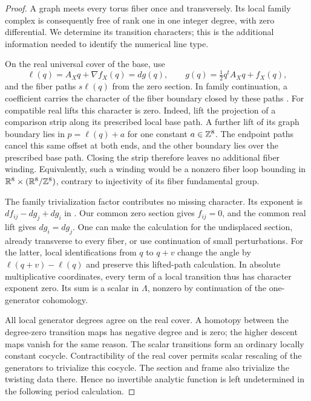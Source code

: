 \begin{proof}
A graph meets every torus fiber once and transversely.  Its local
family complex is consequently free of rank one in one integer
degree, with zero differential.  We determine its transition
characters; this is the additional information needed to identify
the numerical line type.

On the real universal cover of the base, use
\[
 \ell(q)=A_Xq+\nabla f_X(q)=dg(q),\qquad
 g(q)=\tfrac12q^tA_Xq+f_X(q),
\]
and the fiber paths $s\ell(q)$ from the zero section.  In family
continuation, a coefficient carries the character of the fiber
boundary closed by these paths
\cite[\S\S2.2 and 8.2]{abouzaid-faithful}.  For compatible real lifts
this character is zero.  Indeed, lift the projection of a comparison
strip along its prescribed local base path.  A further lift of its
graph boundary lies in
$p=\ell(q)+a$ for one constant $a\in\mathbb Z^8$.  The endpoint paths cancel
this same offset at both ends, and the other boundary lies over the
prescribed base path.  Closing the strip therefore leaves no
additional fiber winding.  Equivalently, such a winding would be a
nonzero fiber loop bounding in
$\mathbb R^8\times(\mathbb R^8/\mathbb Z^8)$, contrary to injectivity of its fiber
fundamental group.

The family trivialization factor contributes no missing character.
Its exponent is $df_{ij}-dg_j+dg_i$ in
\cite[Equation~(8.16)]{abouzaid-faithful}.  Our common zero section
gives $f_{ij}=0$, and the common real lift gives $dg_i=dg_j$.
One can make the calculation for the undisplaced section, already
transverse to every fiber, or use continuation of small perturbations.
For the latter, local identifications from $q$ to $q+v$ change the
angle by $\ell(q+v)-\ell(q)$ and preserve this lifted-path calculation.
In absolute multiplicative coordinates, every term of a local
transition thus has character exponent zero.  Its sum is a scalar
in $\Lambda$, nonzero by continuation of the one-generator
cohomology.

All local generator degrees agree on the real cover.  A homotopy
between the degree-zero transition maps has negative degree and is
zero; the higher descent maps vanish for the same reason.  The
scalar transitions form an ordinary locally constant cocycle.
Contractibility of the real cover permits scalar rescaling of the
generators to trivialize this cocycle.  The section and frame also
trivialize the twisting data there.  Hence no invertible analytic
function is left undetermined in the following period calculation.


\end{proof}
